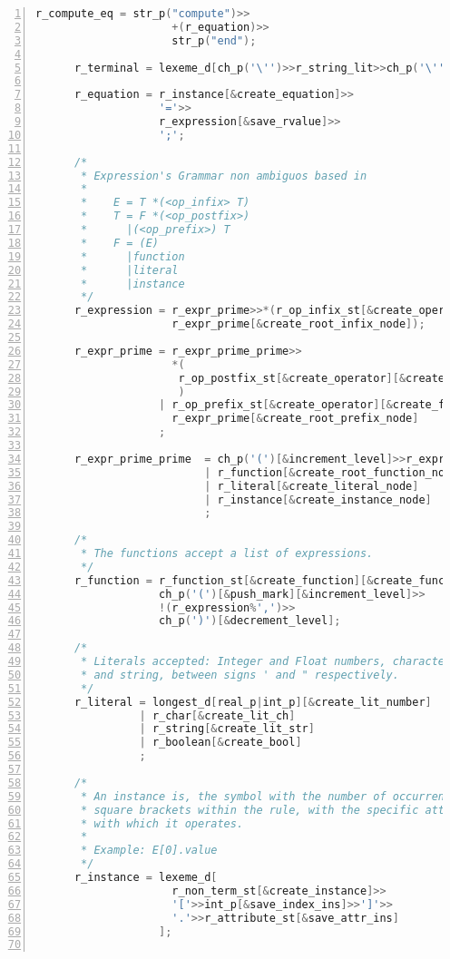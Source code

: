 \begin{lstlisting}[numbers=left,basicstyle=\tiny,language=C++,numberstyle=\tiny, numbersep=5pt]
      r_compute_eq = str_p("compute")>>
                     +(r_equation)>>
                     str_p("end");

      r_terminal = lexeme_d[ch_p('\'')>>r_string_lit>>ch_p('\'')];

      r_equation = r_instance[&create_equation]>>
                   '='>>
                   r_expression[&save_rvalue]>>
                   ';';

      /*
       * Expression's Grammar non ambiguos based in
       *
       *    E = T *(<op_infix> T)
       *    T = F *(<op_postfix>)
       *      |(<op_prefix>) T
       *    F = (E)
       *      |function
       *      |literal
       *      |instance
       */
      r_expression = r_expr_prime>>*(r_op_infix_st[&create_operator][&create_func_node]>>
                     r_expr_prime[&create_root_infix_node]);

      r_expr_prime = r_expr_prime_prime>>
                     *(
                      r_op_postfix_st[&create_operator][&create_func_node][&create_root_postfix_node]
                      )
                   | r_op_prefix_st[&create_operator][&create_func_node]>>
                     r_expr_prime[&create_root_prefix_node]
                   ;

      r_expr_prime_prime  = ch_p('(')[&increment_level]>>r_expression>>ch_p(')')[&decrement_level]
                          | r_function[&create_root_function_node]
                          | r_literal[&create_literal_node]
                          | r_instance[&create_instance_node]
                          ;

      /*
       * The functions accept a list of expressions.
       */
      r_function = r_function_st[&create_function][&create_func_node]>>
                   ch_p('(')[&push_mark][&increment_level]>>
                   !(r_expression%',')>>
                   ch_p(')')[&decrement_level];

      /*
       * Literals accepted: Integer and Float numbers, characters
       * and string, between signs ' and " respectively.
       */
      r_literal = longest_d[real_p|int_p][&create_lit_number]
                | r_char[&create_lit_ch]
                | r_string[&create_lit_str]
                | r_boolean[&create_bool]
                ;

      /*
       * An instance is, the symbol with the number of occurrences in
       * square brackets within the rule, with the specific attribute
       * with which it operates.
       *
       * Example: E[0].value
       */
      r_instance = lexeme_d[
                     r_non_term_st[&create_instance]>>
                     '['>>int_p[&save_index_ins]>>']'>>
                     '.'>>r_attribute_st[&save_attr_ins]
                   ];


\end{lstlisting}
